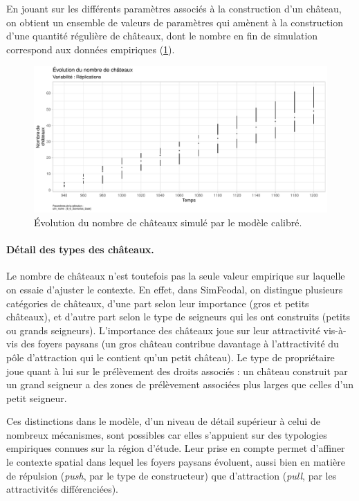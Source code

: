 En jouant sur les différents paramètres associés à la construction d'un château, on obtient un ensemble de valeurs de paramètres qui amènent à la construction d'une quantité régulière de châteaux, dont le nombre en fin de simulation correspond aux données empiriques (\cref{fig:calibrage-chateaux-nb}).

\begin{figure}[H]
	\centering
	\includegraphics[width=\linewidth]{img/results_6_6/Chateaux_Nb_Haut.pdf}
	\caption{Évolution du nombre de châteaux simulé par le modèle calibré. %
	}
	\label{fig:calibrage-chateaux-nb}
\end{figure}

\paragraph{Détail des types des châteaux.}
Le nombre de châteaux n'est toutefois pas la seule valeur empirique sur laquelle on essaie d'ajuster le contexte.
En effet, dans SimFeodal, on distingue plusieurs catégories de châteaux, d'une part selon leur importance (gros et petits châteaux), et d'autre part selon le type de seigneurs qui les ont construits (petits ou grands seigneurs).
L'importance des châteaux joue sur leur attractivité vis-à-vis des foyers paysans (un gros château contribue davantage à l'attractivité du pôle d'attraction qui le contient qu'un petit château).
Le type de propriétaire joue quant à lui sur le prélèvement des droits associés : un château construit par un grand seigneur a des zones de prélèvement associées plus larges que celles d'un petit seigneur.

Ces distinctions dans le modèle, d'un niveau de détail supérieur à celui de nombreux mécanismes, sont possibles car elles s'appuient sur des typologies empiriques connues sur la région d'étude.
Leur prise en compte permet d'affiner le contexte spatial dans lequel les foyers paysans évoluent, aussi bien en matière de répulsion (\textit{push}, par le type de constructeur) que d'attraction (\textit{pull}, par les attractivités différenciées).


